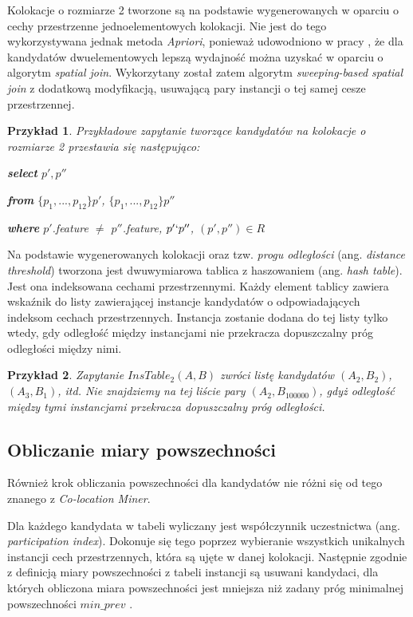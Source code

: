 \documentclass[12pt]{article}
\newtheorem{sample}{Przykład}
\begin{document}
Kolokacje o rozmiarze 2 tworzone są na podstawie wygenerowanych w oparciu o cechy przestrzenne jednoelementowych kolokacji. Nie jest do tego wykorzystywana jednak metoda \textit{Apriori}, ponieważ udowodniono w pracy \cite{huang}, że dla kandydatów dwuelementowych lepszą wydajność można uzyskać w oparciu o algorytm \textit{spatial join}. Wykorzytany został zatem algorytm \textit{sweeping-based spatial join} \cite{spatial} z dodatkową modyfikacją, usuwającą pary instancji o tej samej cesze przestrzennej. 

\begin{sample}Przykładowe zapytanie tworzące kandydatów na kolokacje o rozmiarze 2 przestawia się następująco:

\textbf{select} $ p', p''$

\textbf{from} $ \{p_{1},...,p_{12}\} p' $, $ \{p_{1},...,p_{12}\} p''$

\textbf{where}  $ p' $.feature $ \neq $ $ p'' $.feature, $ p' \lq p'' $, $(p', p'') \in R$
\end{sample}

Na podstawie wygenerowanych kolokacji oraz tzw. \textit{progu odległości} (ang. \textit{distance threshold}) tworzona jest dwuwymiarowa tablica z haszowaniem (ang. \textit{hash table}). Jest ona indeksowana cechami przestrzennymi. Każdy element tablicy zawiera wskaźnik do listy zawierającej instancje kandydatów o odpowiadających indeksom cechach przestrzennych. Instancja zostanie dodana do tej listy tylko wtedy, gdy odległość między instancjami nie przekracza dopuszczalny próg odległości między nimi.

\begin{sample}
Zapytanie $InsTable_{2}(A,B)$ zwróci listę kandydatów $(A_{2}, B_{2})$, $(A_{3}, B_{1})$, itd. Nie znajdziemy na tej liście pary $(A_{2}, B_{100000})$, gdyż odległość między tymi instancjami przekracza dopuszczalny próg odległości.
\end{sample}

\subsection{Obliczanie miary powszechności}

Również krok obliczania powszechności dla kandydatów nie różni się od tego znanego z \textit{Co-location Miner}.

Dla każdego kandydata w tabeli wyliczany jest współczynnik uczestnictwa (ang. \textit{participation index}). Dokonuje się tego poprzez wybieranie wszystkich unikalnych instancji cech przestrzennych, która są ujęte w danej kolokacji. Następnie zgodnie z definicją miary powszechności z tabeli instancji są usuwani kandydaci, dla których obliczona miara powszechności jest mniejsza niż zadany próg minimalnej powszechności $ min\_prev $ \cite{huang}. 
\end{document}
